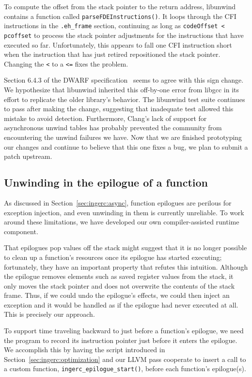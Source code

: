 To compute the offset from the stack pointer to the return address, libunwind
contains a function called \texttt{parseFDEInstructions()}.  It loops through the CFI
instructions in the \texttt{.eh\_frame} section, continuing as long as
\texttt{codeOffset < pcoffset} to process the stack pointer adjustments for the
instructions that have executed so far.  Unfortunately, this appears to fall one CFI
instruction short when the instruction that has just retired repositioned the stack
pointer.  Changing the \texttt{<} to a \texttt{<=} fixes the problem.

Section 6.4.3 of the DWARF specification~\cite{www-dwarf-spec} seems to agree with
this sign change.  We hypothesize that libunwind inherited this off-by-one error from
libgcc in its effort to replicate the older library's behavior.  The libunwind test
suite continues to pass after making the change, suggesting that inadequate test
allowed this mistake to avoid detection.  Furthermore, Clang's lack of support for
asynchronous unwind tables has probably prevented the community from encountering the
unwind failures we have.  Now that we are finished prototyping our changes and
continue to believe that this one fixes a bug, we plan to submit a patch upstream.


\subsection{Unwinding in the epilogue of a function}
\label{sec:ingerc:epilogue}

As discussed in Section~\ref{sec:ingerc:async}, function epilogues are perilous for
exception injection, and even unwinding in them is currently unreliable.  To work
around these limitations, we have developed our own compiler-assisted runtime
component.

That epilogues pop values off the stack might suggest that it is no longer possible
to clean up a function's resources once its epilogue has started executing;
fortunately, they have an important property that refutes this intuition.  Although
the epilogue removes elements such as saved register values from the stack, it only
moves the stack pointer and does not overwrite the contents of the stack frame.
Thus, if we could undo the epilogue's effects, we could then inject an exception and
it would be handled as if the epilogue had never executed at all.  This is precisely
our approach.

To support time traveling backward to just before a function's epilogue, we need the
program to record its instruction pointer just before it enters the epilogue.  We
accomplish this by having the script introduced in
Section~\ref{sec:ingerc:optimization} and our LLVM pass cooperate to insert a call to
a custom function, \texttt{ingerc\_epilogue\_start()}, before each function's
epilogue(s).

